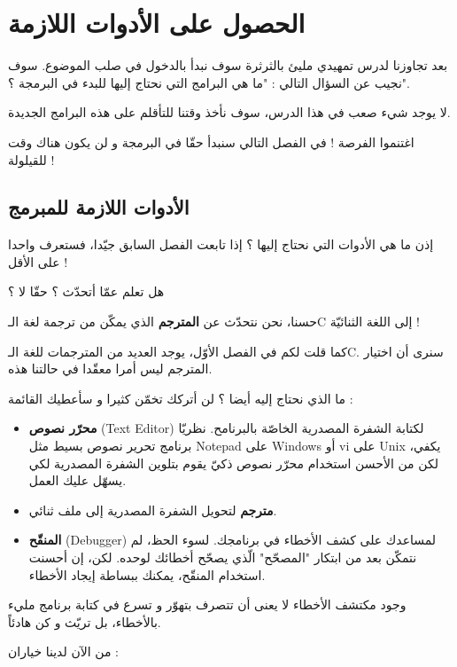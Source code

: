 \chapter{الحصول على الأدوات اللازمة}

بعد تجاوزنا لدرس تمهيدي مليئ بالثرثرة سوف نبدأ بالدخول في صلب الموضوع. سوف نجيب عن السؤال التالي : "ما هي البرامج التي نحتاج إليها للبدء في البرمجة ؟".

لا يوجد شيء صعب في هذا الدرس، سوف نأخذ وقتنا للتأقلم على هذه البرامج الجديدة.

اغتنموا الفرصة ! في الفصل التالي سنبدأ حقّا في البرمجة و لن يكون هناك وقت للقيلولة !

\section{الأدوات اللازمة للمبرمج}

إذن ما هي الأدوات التي نحتاج إليها ؟
إذا تابعت الفصل السابق جيّدا، فستعرف واحدا على الأقل !

هل تعلم عمّا أتحدّث ؟ حقّا لا ؟

حسنا، نحن نتحدّث عن
\textbf{المترجم}
الذي يمكّن من ترجمة لغة الـ\textenglish{C}
إلى اللغة الثنائيّة !

كما قلت لكم في الفصل الأوّل، يوجد العديد من المترجمات للغة الـ\textenglish{C}.
سنرى أن اختيار المترجم ليس أمرا معقّدا في حالتنا هذه.

ما الذي نحتاج إليه أيضا ؟ لن أتركك تخمّن كثيرا و سأعطيك القائمة :

\begin{itemize}
  \item \textbf{محرّر نصوص }
(\textenglish{Text Editor})
لكتابة الشفرة المصدرية الخاصّة بالبرنامح. نظريّا برنامج تحرير نصوص بسيط مثل
\textenglish{Notepad}
على
\textenglish{Windows}
أو
\textenglish{vi}
على
\textenglish{Unix}
يكفي، لكن من الأحسن استخدام محرّر نصوص ذكيّ يقوم بتلوين الشفرة المصدرية لكي يسهّل عليك العمل.
  \item \textbf{مترجم}
  لتحويل الشفرة المصدرية إلى ملف ثنائي.
  \item \textbf{المنقّح}
(\textenglish{Debugger})
لمساعدك على كشف الأخطاء في برنامجك. لسوء الحظ، لم نتمكّن بعد من ابتكار "المصحّح" الّذي يصحّح أخطائك لوحده. لكن، إن أحسنت استخدام المنقّح، يمكنك ببساطة إيجاد الأخطاء.
\end{itemize}

وجود مكتشف الأخطاء لا يعنى أن تتصرف بتهوّر و تسرع في كتابة برنامج مليء بالأخطاء، بل تريّث و كن هادئاً.

من الآن لدينا خياران :

